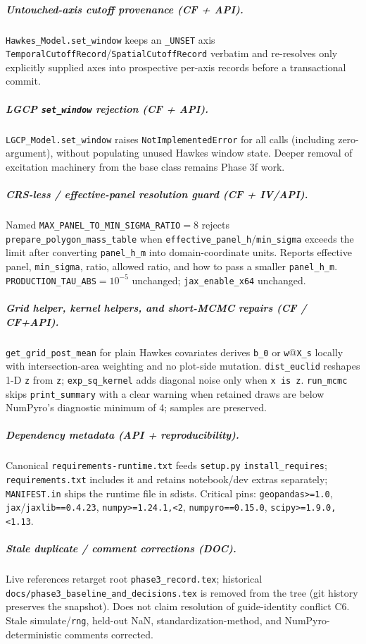 \documentclass[
  10pt,
]{article}
\begin{document}
\subparagraph{Untouched-axis cutoff provenance (CF + API).}
\texttt{Hawkes\_Model.set\_window} keeps an \texttt{\_UNSET} axis \texttt{TemporalCutoffRecord}/\texttt{SpatialCutoffRecord} verbatim and re-resolves only explicitly supplied axes into prospective per-axis records before a transactional commit.

\subparagraph{LGCP \texttt{set\_window} rejection (CF + API).}
\texttt{LGCP\_Model.set\_window} raises \texttt{NotImplementedError} for all calls (including zero-argument), without populating unused Hawkes window state.
Deeper removal of excitation machinery from the base class remains Phase 3f work.

\subparagraph{CRS-less / effective-panel resolution guard (CF + IV/API).}
Named \texttt{MAX\_PANEL\_TO\_MIN\_SIGMA\_RATIO}${}={}8$ rejects \texttt{prepare\_polygon\_mass\_table} when \texttt{effective\_panel\_h}/\texttt{min\_sigma} exceeds the limit after converting \texttt{panel\_h\_m} into domain-coordinate units.
Reports effective panel, \texttt{min\_sigma}, ratio, allowed ratio, and how to pass a smaller \texttt{panel\_h\_m}.
\texttt{PRODUCTION\_TAU\_ABS}${}={}10^{-5}$ unchanged; \texttt{jax\_enable\_x64} unchanged.

\subparagraph{Grid helper, kernel helpers, and short-MCMC repairs (CF / CF+API).}
\texttt{get\_grid\_post\_mean} for plain Hawkes covariates derives \texttt{b\_0} or \texttt{w}@\texttt{X\_s} locally with intersection-area weighting and no plot-side mutation.
\texttt{dist\_euclid} reshapes 1-D \texttt{z} from \texttt{z}; \texttt{exp\_sq\_kernel} adds diagonal noise only when \texttt{x is z}.
\texttt{run\_mcmc} skips \texttt{print\_summary} with a clear warning when retained draws are below NumPyro's diagnostic minimum of 4; samples are preserved.

\subparagraph{Dependency metadata (API + reproducibility).}
Canonical \texttt{requirements-runtime.txt} feeds \texttt{setup.py} \texttt{install\_requires}; \texttt{requirements.txt} includes it and retains notebook/dev extras separately; \texttt{MANIFEST.in} ships the runtime file in sdists.
Critical pins: \texttt{geopandas>=1.0}, \texttt{jax}/\texttt{jaxlib==0.4.23}, \texttt{numpy>=1.24.1,<2}, \texttt{numpyro==0.15.0}, \texttt{scipy>=1.9.0,<1.13}.

\subparagraph{Stale duplicate / comment corrections (DOC).}
Live references retarget root \texttt{phase3\_record.tex}; historical \texttt{docs/phase3\_baseline\_and\_decisions.tex} is removed from the tree (git history preserves the snapshot).
Does not claim resolution of guide-identity conflict C6.
Stale simulate/\texttt{rng}, held-out NaN, standardization-method, and NumPyro-deterministic comments corrected.
\end{document}
